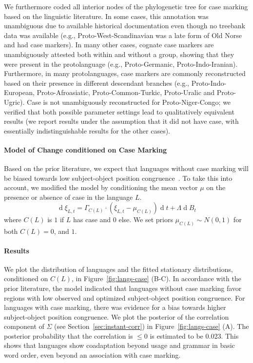 \documentclass[11pt,a4paper]{article}
\begin{document}
We furthermore coded all interior nodes of the phylogenetic tree for case marking based on the linguistic literature.
In some cases, this annotation was unambiguous due to available historical documentation even though no treebank data was available (e.g., Proto-West-Scandinavian was a late form of Old Norse and had case markers).
In many other cases, cognate case markers are unambiguously attested both within and without a group, showing that they were present in the protolanguage (e.g., Proto-Germanic, Proto-Indo-Iranian).
Furthermore, in many protolanguages, case markers are commonly reconstructed based on their presence in different descendant branches (e.g., Proto-Indo-European, Proto-Afroasiatic, Proto-Common-Turkic, Proto-Uralic and Proto-Ugric). %
Case is not unambiguously reconstructed for Proto-Niger-Congo; we verified that both possible parameter settings lead to qualitatively equivalent results (we report results under the assumption that it did not have case, with essentially indistinguishable results for the other cases).

\paragraph{Model of Change conditioned on Case Marking}
Based on the prior literature, we expect that languages without case marking will be biased towards low subject-object position congruence~\citep{vennemann1974explanation}.
To take this into account, we modified the model by conditioning the mean vector $\mu$ on the presence or absence of case in the language $L$.
\begin{equation*}
    \operatorname{d}\xi_{L,t} = \Gamma_{C(L)} \cdot (\xi_{L,t}-\mu_{C(L)}) \operatorname{d}t + \Lambda \operatorname{d}B_t
\end{equation*}
where $C(L)$ is $1$ if $L$ has case and $0$ else.
We set priors $\mu_{C(L)} \sim N(0,1)$ for both $C(L) = 0$, and $1$.

\paragraph{Results}
We plot the distribution of languages and the fitted stationary distributions, conditioned on $C(L)$, in Figure~\ref{fig:langs-case} (B-C).
In accordance with the prior literature, the model indicated that languages without case marking favor regions with low observed and optimized subject-object position congruence.
For languages with case marking, there was evidence for a bias towards higher subject-object position congruence.
We plot the posterior of the correlation component of $\Sigma$ (see Section~\ref{sec:instant-corr}) in Figure~\ref{fig:langs-case} (A).
The posterior probability that the correlation is $\leq 0$ is estimated to be $0.023$.
This shows that languages show coadaptation beyond usage and grammar in basic word order, even beyond an association with case marking.
\end{document}
